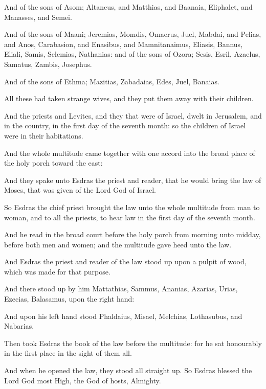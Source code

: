 {\par }{\PP {}And of the sons of Asom; Altaneus, and Matthias, and Baanaia, Eliphalet, and Manasses, and Semei.
\par }{\PP {}And of the sons of Maani; Jeremias, Momdis, Omaerus, Juel, Mabdai, and Pelias, and Anos, Carabasion, and Enasibus, and Mamnitanaimus, Eliasis, Bannus, Eliali, Samis, Selemias, Nathanias: and of the sons of Ozora; Sesis, Esril, Azaelus, Samatus, Zambis, Josephus.
\par }{\PP {}And of the sons of Ethma; Mazitias, Zabadaias, Edes, Juel, Banaias.
\par }{\PP {}All these had taken strange wives, and they put them away with their children.
\par }{\PP {}And the priests and Levites, and they that were of Israel, dwelt in Jerusalem, and in the country, in the first day of the seventh month: so the children of Israel were in their habitations.
\par }{\PP {}And the whole multitude came together with one accord into the broad place of the holy porch toward the east:
\par }{\PP {}And they spake unto Esdras the priest and reader, that he would bring the law of Moses, that was given of the Lord God of Israel.
\par }{\PP {}So Esdras the chief priest brought the law unto the whole multitude from man to woman, and to all the priests, to hear law in the first day of the seventh month.
\par }{\PP {}And he read in the broad court before the holy porch from morning unto midday, before both men and women; and the multitude gave heed unto the law.
\par }{\PP {}And Esdras the priest and reader of the law stood up upon a pulpit of wood, which was made for that purpose.
\par }{\PP {}And there stood up by him Mattathias, Sammus, Ananias, Azarias, Urias, Ezecias, Balasamus, upon the right hand:
\par }{\PP {}And upon his left hand stood Phaldaius, Misael, Melchias, Lothasubus, and Nabarias.
\par }{\PP {}Then took Esdras the book of the law before the multitude: for he sat honourably in the first place in the sight of them all.
\par }{\PP {}And when he opened the law, they stood all straight up. So Esdras blessed the Lord God most High, the God of hosts, Almighty.
}
